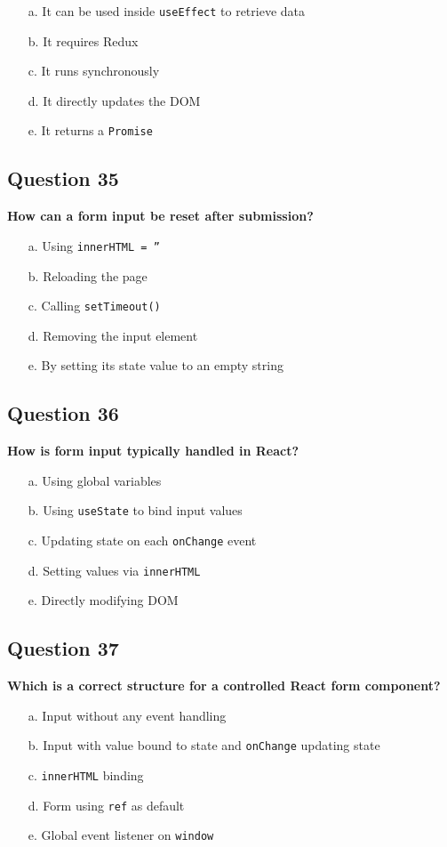 \documentclass{article}
\begin{document}
\begin{itemize}
  \item[a.] It can be used inside \texttt{useEffect} to retrieve data
  \item[b.] It requires Redux
  \item[c.] It runs synchronously
  \item[d.] It directly updates the DOM
  \item[e.] It returns a \texttt{Promise}
\end{itemize}

\subsection*{Question 35}
\textbf{How can a form input be reset after submission?}

\begin{itemize}
  \item[a.] Using \texttt{innerHTML = ''}
  \item[b.] Reloading the page
  \item[c.] Calling \texttt{setTimeout()}
  \item[d.] Removing the input element
  \item[e.] By setting its state value to an empty string
\end{itemize}

\subsection*{Question 36}
\textbf{How is form input typically handled in React?}

\begin{itemize}
  \item[a.] Using global variables
  \item[b.] Using \texttt{useState} to bind input values
  \item[c.] Updating state on each \texttt{onChange} event
  \item[d.] Setting values via \texttt{innerHTML}
  \item[e.] Directly modifying DOM
\end{itemize}

\subsection*{Question 37}
\textbf{Which is a correct structure for a controlled React form component?}

\begin{itemize}
  \item[a.] Input without any event handling
  \item[b.] Input with value bound to state and \texttt{onChange} updating state
  \item[c.] \texttt{innerHTML} binding
  \item[d.] Form using \texttt{ref} as default
  \item[e.] Global event listener on \texttt{window}
\end{itemize}
\end{document}
